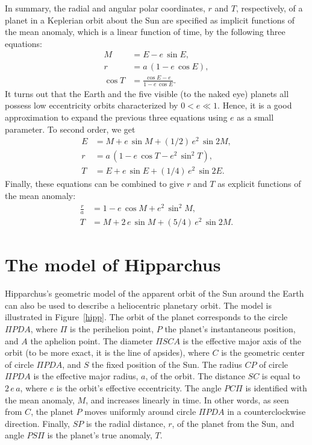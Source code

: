 In summary, the radial and angular polar coordinates, $r$ and $T$, respectively,
of a planet in a Keplerian orbit about the Sun are specified as  implicit functions
of the mean anomaly, which is a  linear function of time, by the
following three equations:
\begin{align}
M &= E - e\,\sin E,\\[0.5ex]
r &= a\,(1- e\,\cos E),\\[0.5ex]
\cos T &= \frac{\cos E - e}{1-e\,\cos E}.
\end{align}
It turns out that the Earth and the five visible (to the naked eye) planets all possess  low eccentricity orbits characterized by $0<e\ll 1$. Hence, it is a good approximation to expand the previous three equations
using $e$ as a small parameter. To second order, we
get
\begin{align}
E &= M + e\,\sin M + (1/2)\,e^2\,\sin 2M,\\[0.5ex]
r& = a\,(1-e\,\cos T - e^2\,\sin^2 T),\\[0.5ex]
T &= E + e\,\sin E + (1/4)\,e^2\,\sin 2 E.
\end{align}
Finally, these equations can be combined to give $r$ and $T$ as explicit  functions of the
mean anomaly:
\begin{align}
\frac{r}{a} &= 1 -e\,\cos M + e^2\,\sin^2 M,\label{je22}\\[0.5ex]
T &= M + 2\,e\,\sin M + (5/4)\,e^2\,\sin 2M.\label{je23}
\end{align}

\section{The model of Hipparchus}
Hipparchus's geometric model of the apparent orbit of the Sun around the Earth can also be used to describe a heliocentric planetary orbit. The model is illustrated  in Figure~\ref{hipp}. The orbit of the planet corresponds
to the circle $\Pi P D A$, where $\Pi$ is the perihelion point, $P$ the planet's instantaneous position,
and $A$ the aphelion point. The diameter $\Pi   S C A$ is the effective major axis of the orbit (to be more exact, it
is the line of apsides), where $C$ is the geometric center of circle $\Pi P D A$, and $S$ the fixed position of the Sun.
The radius $CP$ of circle $\Pi PDA$ is   the effective major radius, $a$, of the orbit.  The distance $SC$ is
equal to $2\,e\,a$, where $e$ is the orbit's effective eccentricity. The angle $PC\Pi$
is  identified with the  mean anomaly, $M$, and increases  linearly  in time.  In other words, as seen from $C$, the planet
$P$ moves  uniformly around circle $\Pi PDA$ in a counterclockwise direction. Finally, $SP$ is the radial
distance, $r$, of the planet from the Sun, and angle $P S \Pi$ is the planet's true anomaly, $T$.

